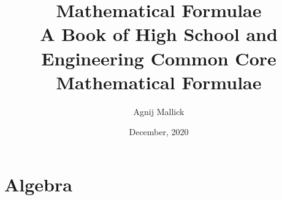 \documentclass[openany, oneside]{book}
\title{Mathematical Formulae\\A Book of High School and Engineering Common Core Mathematical Formulae}
\date{December, 2020}
\author{Agnij Mallick}
\begin{document}
	\maketitle
	\tableofcontents

	\part{Algebra}
		
	
	
\end{document}
